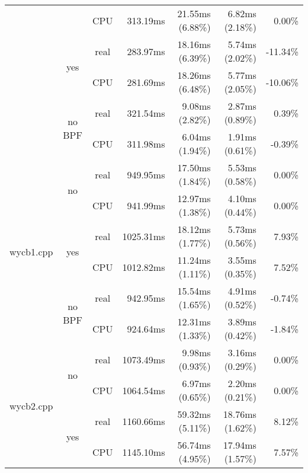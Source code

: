 \documentclass[en]{pracamgr}
\begin{document}
\begin{appendices}
\begin{small}
\begin{longtable}{|l|c|c|r|r|r|r|}
                            &                         & CPU  & 313.19ms & 21.55ms (6.88\%) & 6.82ms (2.18\%) & 0.00\% \\*
                            \cline{2-7}
                            & \multirow{2}{*}{yes}    & real & 283.97ms & 18.16ms (6.39\%) & 5.74ms (2.02\%) & -11.34\% \\*
                            &                         & CPU  & 281.69ms & 18.26ms (6.48\%) & 5.77ms (2.05\%) & -10.06\% \\*
                            \cline{2-7}
                            & \multirow{2}{*}{no BPF} & real & 321.54ms & 9.08ms (2.82\%) & 2.87ms (0.89\%) & 0.39\% \\*
                            &                         & CPU  & 311.98ms & 6.04ms (1.94\%) & 1.91ms (0.61\%) & -0.39\% \\
\hline
\multirow{6}{*}{wycb1.cpp}  & \multirow{2}{*}{no}     & real & 949.95ms & 17.50ms (1.84\%) & 5.53ms (0.58\%) & 0.00\% \\*
                            &                         & CPU  & 941.99ms & 12.97ms (1.38\%) & 4.10ms (0.44\%) & 0.00\% \\*
                            \cline{2-7}
                            & \multirow{2}{*}{yes}    & real & 1025.31ms & 18.12ms (1.77\%) & 5.73ms (0.56\%) & 7.93\% \\*
                            &                         & CPU  & 1012.82ms & 11.24ms (1.11\%) & 3.55ms (0.35\%) & 7.52\% \\*
                            \cline{2-7}
                            & \multirow{2}{*}{no BPF} & real & 942.95ms & 15.54ms (1.65\%) & 4.91ms (0.52\%) & -0.74\% \\*
                            &                         & CPU  & 924.64ms & 12.31ms (1.33\%) & 3.89ms (0.42\%) & -1.84\% \\
\hline
\multirow{6}{*}{wycb2.cpp}  & \multirow{2}{*}{no}     & real & 1073.49ms & 9.98ms (0.93\%) & 3.16ms (0.29\%) & 0.00\% \\*
                            &                         & CPU  & 1064.54ms & 6.97ms (0.65\%) & 2.20ms (0.21\%) & 0.00\% \\*
                            \cline{2-7}
                            & \multirow{2}{*}{yes}    & real & 1160.66ms & 59.32ms (5.11\%) & 18.76ms (1.62\%) & 8.12\% \\*
                            &                         & CPU  & 1145.10ms & 56.74ms (4.95\%) & 17.94ms (1.57\%) & 7.57\% \\*

\end{longtable}
\end{small}
\end{appendices}
\end{document}
